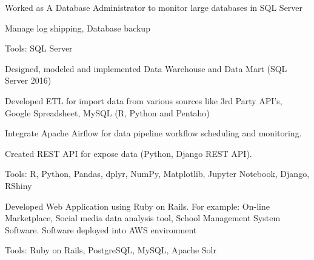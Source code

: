 \documentclass[letterpaper]{deedy-resume} %
\begin{document}
\begin{minipage}[t]{0.66\textwidth}
\sectionspace %


\begin{tightitemize}
\item Worked as A Database Administrator to monitor large databases in SQL Server
\item Manage log shipping, Database backup
\item Tools: SQL Server

\end{tightitemize}

\sectionspace %


\begin{tightitemize}
\item Designed, modeled and implemented Data Warehouse and Data Mart (SQL Server 2016)
\item Developed ETL for import data from various sources like 3rd Party API’s, Google Spreadsheet, MySQL (R, Python and Pentaho)
\item Integrate Apache Airflow for data pipeline workflow scheduling and monitoring.
\item Created REST API for expose data (Python, Django REST API).
\item Tools: R, Python, Pandas, dplyr, NumPy, Matplotlib, Jupyter Notebook, Django, RShiny
\end{tightitemize}

\sectionspace %



\begin{tightitemize}
\item Developed Web Application using Ruby on Rails. For example: On-line Marketplace, Social media data analysis tool, School Management System Software. Software deployed into AWS environment
\item Tools: Ruby on Rails, PostgreSQL, MySQL, Apache Solr
\end{tightitemize}

\sectionspace %

\end{minipage} %
\end{document}
